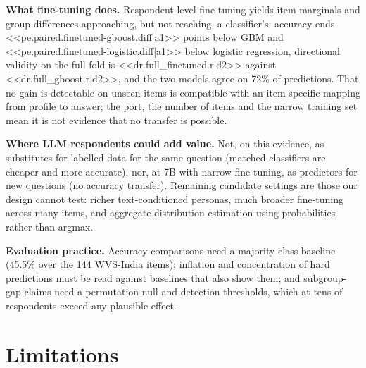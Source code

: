 \documentclass[conference]{IEEEtran}
\begin{document}
\textbf{What fine-tuning does.} Respondent-level fine-tuning yields item marginals and group differences approaching, but not reaching, a classifier's: accuracy ends <<pe.paired.finetuned-gboost.diff|a1>> points below GBM and <<pe.paired.finetuned-logistic.diff|a1>> below logistic regression, directional validity on the full fold is <<dr.full_finetuned.r|d2>> against <<dr.full_gboost.r|d2>>, and the two models agree on 72\% of predictions. That no gain is detectable on unseen items is compatible with an item-specific mapping from profile to answer; the port, the number of items and the narrow training set mean it is not evidence that no transfer is possible.

\textbf{Where LLM respondents could add value.} Not, on this evidence, as substitutes for labelled data for the same question (matched classifiers are cheaper and more accurate), nor, at 7B with narrow fine-tuning, as predictors for new questions (no accuracy transfer). Remaining candidate settings are those our design cannot test: richer text-conditioned personas, much broader fine-tuning across many items, and aggregate distribution estimation using probabilities rather than argmax.

\textbf{Evaluation practice.} Accuracy comparisons need a majority-class baseline (45.5\% over the 144 WVS-India items); inflation and concentration of hard predictions must be read against baselines that also show them; and subgroup-gap claims need a permutation null and detection thresholds, which at tens of respondents exceed any plausible effect.

\section{Limitations}
\end{document}
